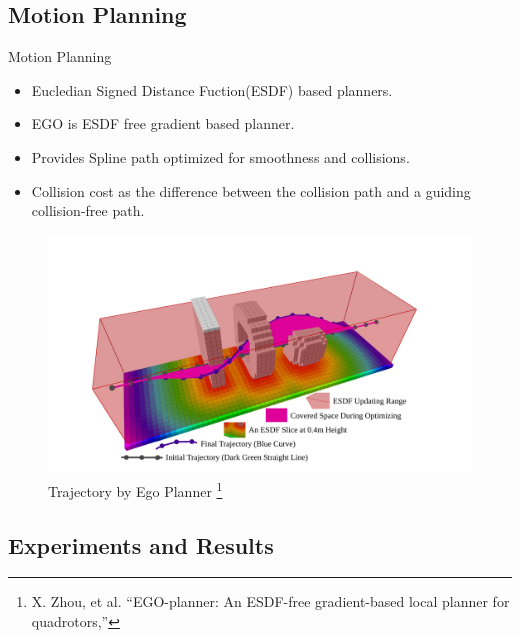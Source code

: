 \documentclass[10pt]{beamer}
\begin{document}
\subsection*{Motion Planning}
\begin{frame}{Motion Planning}
    \begin{itemize}
        \item Eucledian Signed Distance Fuction(ESDF) based planners.
        \item EGO is ESDF free gradient based planner.
        \item Provides Spline path optimized for smoothness and collisions.
        \item Collision cost as the difference between the collision path and a guiding collision-free path.
        
    \end{itemize}
    \begin{figure}[!ht]
        \centering
        \includegraphics[scale=0.25]{esdf2.pdf}
        \caption{Trajectory by Ego Planner \footnote{X. Zhou, et al. “EGO-planner: An ESDF-free gradient-based local planner for quadrotors,”}}
        \label{fig:ego_planner}
    \end{figure}
\end{frame}

\subsection*{Experiments and Results}
\end{document}
